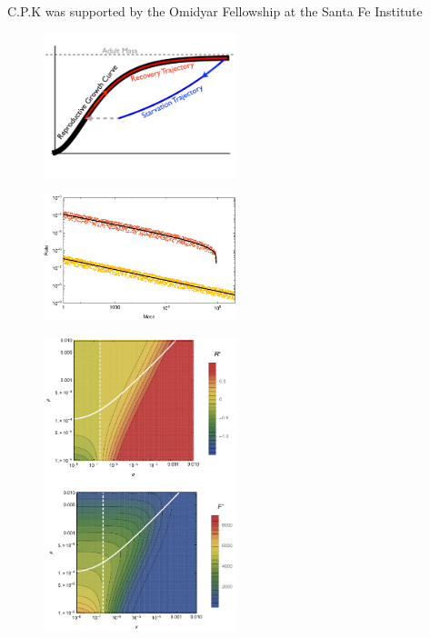 \documentclass{pnastwo}
\begin{document}
\begin{article}



\begin{acknowledgments}
C.P.K was supported by the Omidyar Fellowship at the Santa Fe Institute
\end{acknowledgments}






\end{article}






\begin{figure}
\centering
\includegraphics[width=0.5\textwidth]{Growth-trajectory-diagram.pdf}
\caption{ %
}
\label{fig:growth}
\end{figure}

\begin{figure}
\centering
\includegraphics[width=0.5\textwidth]{fig_GvS.pdf}
\caption{ %
}
\label{fig:gvs}
\end{figure}

\begin{figure}
\centering
\includegraphics[width=0.5\textwidth]{fig_FixedPoint.pdf}
\caption{ %
}
\label{fig:fp}
\end{figure}
\end{document}
